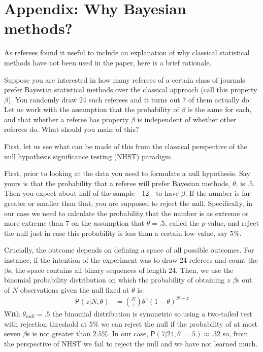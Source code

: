 
\appendix
\section{Appendix: Why Bayesian methods?}

As referees found it useful to include an explanation of why classical statistical methods have not been used in the paper, here is a brief rationale.

Suppose you are interested in how many referees of a certain class of journals prefer Bayesian statistical methods over the classical approach (call this property $\beta$). You randomly draw 24 such referees  and it turns out 7 of them actually do. Let us work with the assumption that the probability of $\beta$ is the same for each, and that whether a referee has property $\beta$ is independent of whether other referees do. What should you make of this?
  
  First, let us see what can be made of this from the classical perspective of the null hypothesis significance testing (NHST) paradigm.

First, prior to looking at the data you need to formulate a null hypothesis. Say yours is that the probability that a referee will prefer Bayesian methods, $\theta$, is $.5$. Then you expect about half of the sample---12---to have $\beta$. If the number is far greater or smaller than that, you are supposed to reject the null. Specifically, in our case we need to calculate the probability that the number is as extreme or more extreme than 7 on the assumption that $\theta =.5$, called the $p$-value, and reject the null just in case this probability is less than a certain low value, say $5\%$.

Crucially, the outcome depends on defining a space of all possible outcomes. For instance, if the intention of the experiment was to draw 24 referees and count the $\beta$s, the space contains all binary sequences of length 24. Then, we use the binomial probability distribution on which the probability of obtaining $z$ $\beta$s out of $N$ observations given the null fixed at $\theta$ is:
  \begin{align*}
\mathsf{P}(z\vert N, \theta) & = {N\choose  z} \theta^z (1  - \theta)^{N-z}
\end{align*}
\noindent With $\theta_{null}=.5$ the binomial distribution is symmetric so using a two-tailed test with rejection threshold at $5\%$ we can reject the null if the probability of at most seven $\beta$s is not greater than $2.5\%$. In our case, $\mathsf{P}(7\vert 24, \theta =.5)\approx.32$  so, from the perspective of NHST we fail to reject the null and we have not learned much.






